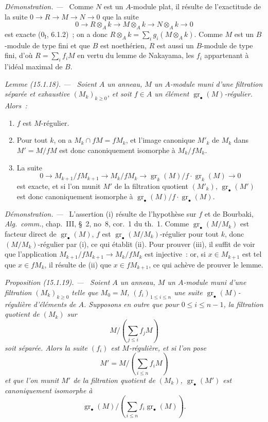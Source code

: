 \documentclass[10pt,oneside]{book}
\makeatletter
\newcommand{\gr}{\operatorname{gr}}
\newcommand{\setmanualcurrentlabel}[1]{\def\@currentlabel{#1}}
\newcommand{\oldpage}[2][]{%
  \setcounter{footnote}{0}%
  \marginpar{\scriptsize\textbf{#1}~|~#2}\ignorespaces}
\newenvironment{proposition}[1][]{%
  \setmanualcurrentlabel{#1}\par\medskip\noindent\itshape Proposition (#1). ---\ }{\par}
\newenvironment{lemma}[1][]{%
  \setmanualcurrentlabel{#1}\par\medskip\noindent\itshape Lemme (#1). ---\ }{\par}
\newenvironment{proof}{%
  \par\medskip\noindent\textit{Démonstration. ---\ }}{\par}
\makeatother
\begin{document}
\begin{proof}
\oldpage[0\textsubscript{IV-1}]{19}
Comme $N$ est un $A$-module plat, il résulte de l'exactitude de la suite
$0\to R\to M\to N\to0$ que la suite
\[
  0\longrightarrow R\otimes_A k\longrightarrow M\otimes_A k
  \longrightarrow N\otimes_A k\longrightarrow0
\]
est exacte ($0_{\mathrm I}$, 6.1.2)~; on a donc
$R\otimes_A k=\sum_i g_i(M\otimes_A k)$. Comme $M$ est un $B$-module de type
fini et que $B$ est noethérien, $R$ est aussi un $B$-module de type fini,
d'où $R=\sum_i f_iM$ en vertu du lemme de Nakayama, les $f_i$ appartenant à
l'idéal maximal de $B$.
\end{proof}

\begin{lemma}[15.1.18]
\label{0.15.1.18-fr}
Soient $A$ un anneau, $M$ un $A$-module muni d'une filtration séparée et
exhaustive $(M_k)_{k\geq0}$, et soit $f\in A$ un élément
$\gr_\bullet(M)$-régulier. Alors~:
\begin{enumerate}
  \item[(i)] $f$ est $M$-régulier.
  \item[(ii)] Pour tout $k$, on a $M_k\cap fM=fM_k$, et l'image canonique
  $M'_k$ de $M_k$ dans $M'=M/fM$ est donc canoniquement isomorphe à
  $M_k/fM_k$.
  \item[(iii)] La suite
  \[
    0\longrightarrow M_{k+1}/fM_{k+1}\longrightarrow M_k/fM_k
    \longrightarrow\gr_k(M)/f\cdot\gr_k(M)\longrightarrow0
  \]
  est exacte, et si l'on munit $M'$ de la filtration quotient $(M'_k)$,
  $\gr_\bullet(M')$ est donc canoniquement isomorphe à
  $\gr_\bullet(M)/f\cdot\gr_\bullet(M)$.
\end{enumerate}
\end{lemma}

\begin{proof}
L'assertion (i) résulte de l'hypothèse sur $f$ et de Bourbaki,
\emph{Alg.~comm.}, chap.~III, \S~2, no~8, cor.~1 du th.~1. Comme
$\gr_\bullet(M/M_k)$ est facteur direct de $\gr_\bullet(M)$, $f$ est
$\gr_\bullet(M/M_k)$-régulier pour tout $k$, donc $(M/M_k)$-régulier par
(i), ce qui établit (ii). Pour prouver (iii), il suffit de voir que
l'application $M_{k+1}/fM_{k+1}\to M_k/fM_k$ est injective~: or, si
$x\in M_{k+1}$ est tel que $x\in fM_k$, il résulte de (ii) que
$x\in fM_{k+1}$, ce qui achève de prouver le lemme.
\end{proof}

\begin{proposition}[15.1.19]
\label{0.15.1.19-fr}
Soient $A$ un anneau, $M$ un $A$-module muni d'une filtration
$(M_k)_{k\geq0}$ telle que $M_0=M$, $(f_i)_{1\leq i\leq n}$ une suite
$\gr_\bullet(M)$-régulière d'éléments de $A$. Supposons en outre que pour
$0\leq i\leq n-1$, la filtration quotient de $(M_k)$ sur
\[
  M/\left(\sum_{j\leq i}f_jM\right)
\]
soit séparée. Alors la suite $(f_i)$ est $M$-régulière, et si l'on pose
\[
  M'=M/\left(\sum_{i\leq n}f_iM\right)
\]
et que l'on munit $M'$ de la filtration quotient de $(M_k)$,
$\gr_\bullet(M')$ est canoniquement isomorphe à
\[
  \gr_\bullet(M)/
  \left(\sum_{i\leq n}f_i\gr_\bullet(M)\right).
\]
\end{proposition}
\end{document}
